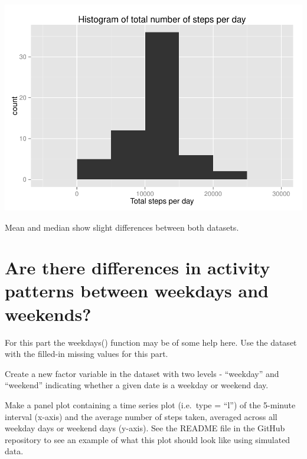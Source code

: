 \documentclass[]{article}
\newenvironment{Shaded}{\begin{snugshade}}{\end{snugshade}}
\newcommand{\KeywordTok}[1]{\textcolor[rgb]{0.13,0.29,0.53}{\textbf{{#1}}}}
\newcommand{\DataTypeTok}[1]{\textcolor[rgb]{0.13,0.29,0.53}{{#1}}}
\newcommand{\StringTok}[1]{\textcolor[rgb]{0.31,0.60,0.02}{{#1}}}
\newcommand{\NormalTok}[1]{{#1}}
\begin{document}
\includegraphics{PA1_template_files/figure-latex/unnamed-chunk-10-1.pdf}

\begin{Shaded}
\end{Shaded}

Mean and median show slight differences between both datasets.

\section{Are there differences in activity patterns between weekdays and
weekends?}\label{are-there-differences-in-activity-patterns-between-weekdays-and-weekends}

For this part the weekdays() function may be of some help here. Use the
dataset with the filled-in missing values for this part.

Create a new factor variable in the dataset with two levels -
``weekday'' and ``weekend'' indicating whether a given date is a weekday
or weekend day.

Make a panel plot containing a time series plot (i.e.~type = ``l'') of
the 5-minute interval (x-axis) and the average number of steps taken,
averaged across all weekday days or weekend days (y-axis). See the
README file in the GitHub repository to see an example of what this plot
should look like using simulated data.
\end{document}
